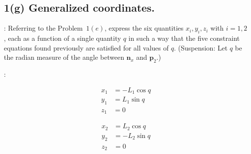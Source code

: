 \subsection{1(g) Generalized coordinates.}
: Referring to the Problem~$1(e)$, express the six quantities
$x_i, y_i, z_i$ with $i=1,2$, each as a function of a single quantity $q$ in
such a way that the five constraint equations found previously are satisfied for
all values of $q$. (Suspension: Let $q$ be the radian measure of the angle
between $\pmb n_x$ and $\pmb p_2$.)

:

\begin{multicols}{2}
\begin{align*}
    x_1 &= -L_1 \cos q\\
    y_1 &= L_1 \sin q\\
    z_1 &=  0
\end{align*}

\begin{align*}
    x_2 &= L_2 \cos q\\
    y_2 &= -L_2 \sin q\\
    z_2 &=  0
\end{align*}
\end{multicols}
